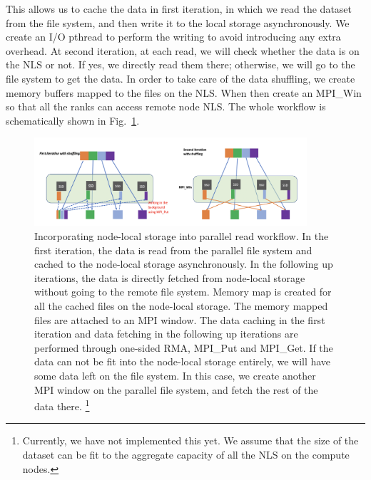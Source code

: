 \documentclass[aps, rmp, 11pt, notitlepage]{revtex4-1}
\begin{document}
This allows us to cache the data in first iteration, in which we read the dataset from the file system, and then write it to the local storage asynchronously. We create an I/O pthread to perform the writing to avoid introducing any extra overhead. At second iteration, at each read, we will check whether the data is on the NLS or not. If yes, we directly read them there; otherwise, we will go to the file system to get the data. In order to take care of the data shuffling, we create memory buffers mapped to the files on the NLS. When then create an MPI\_Win so that all the ranks can access remote node NLS. The whole workflow is schematically shown in Fig.~\ref{fig:read}. 
\begin{figure}[hbt]
\centering
\includegraphics[width=0.9\textwidth]{parallel_read.png}
\caption{Incorporating node-local storage into parallel read workflow. In the first iteration, the data is read from the parallel file system and cached to the node-local storage asynchronously. In the following up iterations, the data is directly fetched from node-local storage without going to the remote file system. Memory map is created for all the cached files on the node-local storage. The memory mapped files are attached to an MPI window. The data caching in the first iteration and data fetching in the following up iterations are performed through one-sided RMA, MPI\_Put and MPI\_Get. If the data can not be fit into the node-local storage entirely, we will have some data left on the file system. In this case, we create another MPI window on the parallel file system, and fetch the rest of the data there. \footnote{Currently, we have not implemented this yet. We assume that the size of the dataset can be fit to the aggregate capacity of all the NLS on the compute nodes.}}\label{fig:read}
\end{figure}
\end{document}
